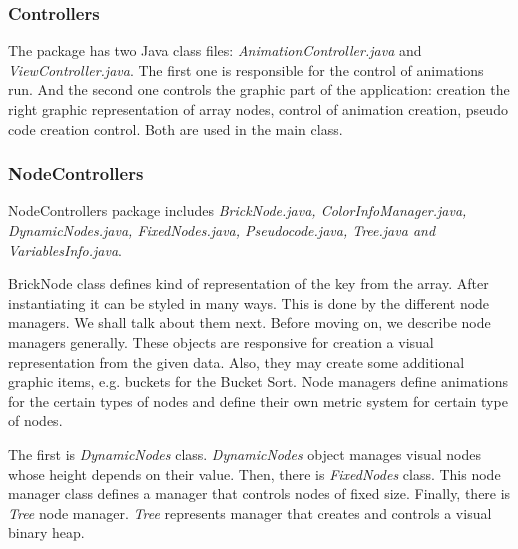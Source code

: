 \documentclass[
  field=inf,
  biblatex,
  language=english,
  glossaries,
  theorems=false,
  index
]{kidiplom}
\begin{document}
\subsubsection{Controllers}
The package has two Java class files: \textit{AnimationController.java} and \textit{ViewController.java}. The first one is responsible for the control of animations run. And the second one controls the graphic part of the application: creation the right graphic representation of array nodes, control of animation creation, pseudo code creation control. Both are used in the main class.

\subsubsection{NodeControllers}
NodeControllers package includes \textit{BrickNode.java, ColorInfoManager.java, DynamicNodes.java, FixedNodes.java, Pseudocode.java, Tree.java and VariablesInfo.java}.

BrickNode class defines kind of representation of the key from the array. After instantiating it can be styled in many ways. This is done by the different node managers. We shall talk about them next. Before moving on, we describe node managers generally. These objects are responsive for creation a visual representation from the given data. Also, they may create some additional graphic items, e.g. buckets for the Bucket Sort. Node managers define animations for the certain types of nodes and define their own metric system for certain type of nodes.

The first is \textit{DynamicNodes} class. \textit{DynamicNodes} object manages visual nodes whose height depends on their value. Then, there is \textit{FixedNodes} class. This node manager class defines a manager that controls nodes of fixed size. Finally, there is \textit{Tree} node manager. \textit{Tree} represents manager that creates and controls a visual binary heap. 
\end{document}

